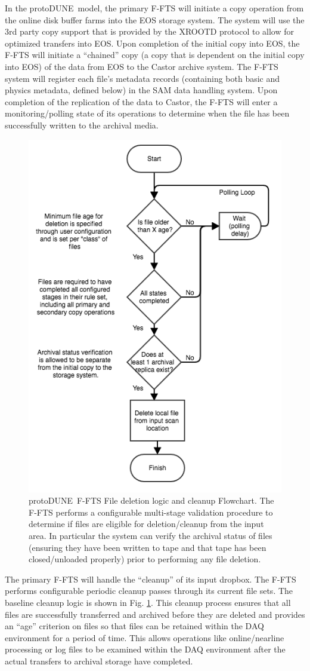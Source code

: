 \documentclass[pdftex,12pt,letter]{article}
\newcommand{\pd}{protoDUNE\ }
\begin{document}
In the \pd model, the primary F-FTS will initiate a copy operation from the online disk buffer farms into the EOS storage system.  The system will use the 3rd party copy support that is provided by the XROOTD protocol to allow for optimized transfers into EOS.  Upon completion of the initial copy into EOS, the F-FTS will initiate a “chained” copy (a copy that is dependent on the initial copy into EOS) of the data from EOS to the Castor archive system.  The F-FTS system will register each file’s metadata records (containing both basic and physics metadata, defined below)  in the SAM data handling system.  Upon completion of the replication of the data to Castor, the F-FTS will enter a monitoring/polling state of its operations to determine when the file has been successfully written to the archival media.


\begin{figure}[tbh]
\centering\includegraphics[width=0.5\linewidth]{fts_file_deletion_flowchart.png}
\caption{\label{fig:ftscleanup}\pd F-FTS File deletion logic and cleanup Flowchart.  The F-FTS performs a configurable multi-stage validation procedure to determine if files are eligible for deletion/cleanup from the input area.  In particular the system can verify the archival status of files (ensuring they have been written to tape and that tape has been closed/unloaded properly) prior to performing any file deletion. }
\end{figure}
The primary F-FTS will handle the “cleanup” of its input dropbox.  The F-FTS performs configurable periodic cleanup passes through its current file sets.  The baseline cleanup logic is shown in Fig. 
\ref{fig:ftscleanup}. 
This cleanup process ensures that all files are successfully transferred and archived before they are deleted and provides an “age” criterion on files so that files can be retained within the DAQ environment for a period of time.  This allows operations like online/nearline processing or log files to be examined within the DAQ environment after the actual transfers to archival storage have completed.
\end{document}
